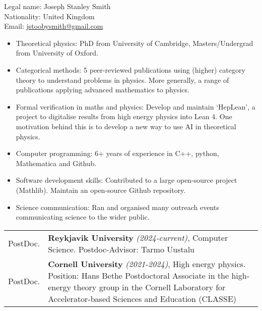 \documentclass[14pt,letter]{article}
\newcommand{\mybullet}{\textcolor{mycolor}{$\ast$}\ }
\newcounter{customtitle}
\begin{document}
\vspace{-2cm}
\begin{flushright}
{{\color{white}Legal name: Joseph Stanley Smith  \\
{\color{white}Nationality:} United Kingdom$\;\;\;\;\;\;\;\,\,$\\
{\color{white}Email:} \href{mailto:jstoobysmith@gmail.com}{jstoobysmith@gmail.com}$\;\;\;\;$}}
\end{flushright}
\vspace{1cm}
	
\noindent 
\vspace{0.3cm}
\begin{itemize}[label=\mybullet]
	\item Theoretical physics: PhD from University of Cambridge, Masters/Undergrad from University of Oxford. 
	\item Categorical methods: 5 peer-reviewed publications using (higher) category theory to understand problems in physics. More generally, a range of publications applying advanced mathematics to physics.
 	\item Formal verification in maths and physics: Develop and maintain `HepLean', a project to digitalise results from high energy physics into Lean 4. One motivation behind this is to develop a new way to use AI in theoretical physics.
 	\item Computer programming: 6+ years of experience in C++, python, Mathematica and Github.
 	\item Software development skills: Contributed to a large open-source project (Mathlib). Maintain an open-source Github repository. 
 	\item Science communication: Ran and organised many outreach events communicating science to the wider public. 
\end{itemize}


\noindent\begin{tabular}{p{}p{}}
	PostDoc. & \textbf{Reykjavik University} \emph{(2024-current)}, Computer Science. \newline 
	{\color{mycolor} Postdoc-Advisor:} Tarmo Uustalu\\
	PostDoc. &  \textbf{Cornell University} \emph{(2021-2024)}, High energy physics.
	\newline 
	{\color{mycolor} Position:}  Hans Bethe Postdoctoral Associate in the high-energy theory group in the Cornell Laboratory for Accelerator-based Sciences and Education (CLASSE)
\end{tabular}
\end{document}

